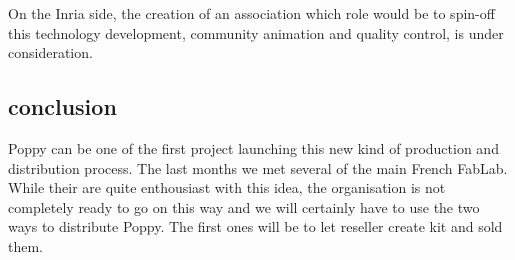 On the Inria side, the creation of an association which role would be to spin-off this technology development, community animation and quality control, is under consideration.


\subsection{conclusion} %
Poppy can be one of the first project launching this new kind of production and distribution process. The last months we met several of the main French FabLab. While their are quite enthousiast with this idea, the organisation is not completely ready to go on this way and we will certainly have to use the two ways to distribute Poppy. The first ones will be to let reseller create kit and sold them.





